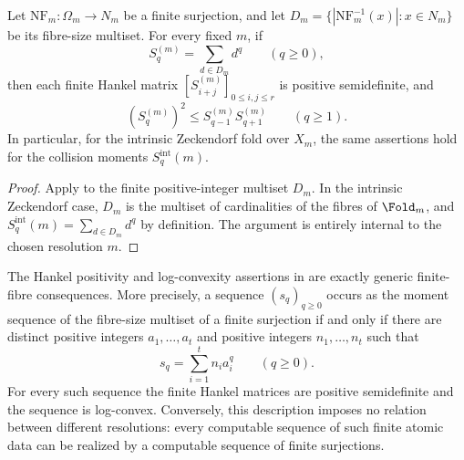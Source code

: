 \begin{corollary}
\label{thm:hankel-psd}
Let \(\mathrm{NF}_m\colon\Omega_m\to N_m\) be a finite surjection, and let
\(D_m=\{|\mathrm{NF}_m^{-1}(x)|:x\in N_m\}\) be its fibre-size
multiset.  For every fixed \(m\), if
\[
  S_q^{(m)}=\sum_{d\in D_m}d^q \qquad(q\ge0),
\]
then each finite Hankel matrix
\([S_{i+j}^{(m)}]_{0\le i,j\le r}\) is positive semidefinite, and
\[
  (S_q^{(m)})^2\le S_{q-1}^{(m)}S_{q+1}^{(m)}\qquad(q\ge1).
\]
In particular, for the intrinsic Zeckendorf fold over \(X_m\), the same assertions
hold for the collision moments \(S_q^{\mathrm{int}}(m)\).
\end{corollary}

\begin{proof}
Apply  to the finite positive-integer
multiset \(D_m\).  In the intrinsic Zeckendorf case, \(D_m\) is the multiset of
cardinalities of the fibres of \(\Fold_m\), and
\(S_q^{\mathrm{int}}(m)=\sum_{d\in D_m}d^q\) by definition.  The argument is
entirely internal to the chosen resolution \(m\).
\end{proof}

\begin{proposition}
\label{rem:hankel-psd-generic}
The Hankel positivity and log-convexity assertions in 
are exactly generic finite-fibre consequences.  More precisely, a sequence
\((s_q)_{q\ge0}\) occurs as the moment sequence of the fibre-size multiset of a
finite surjection if and only if there are distinct positive integers
\(a_1,\ldots,a_t\) and positive integers \(n_1,\ldots,n_t\) such that
\[
  s_q=\sum_{i=1}^t n_i a_i^q\qquad(q\ge0).
\]
For every such sequence the finite Hankel matrices are positive semidefinite and
the sequence is log-convex.  Conversely, this description imposes no relation
between different resolutions: every computable sequence of such finite atomic
data can be realized by a computable sequence of finite surjections.
\end{proposition}

